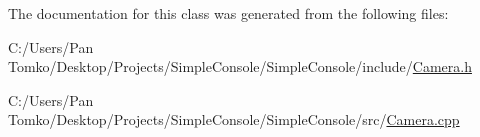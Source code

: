 The documentation for this class was generated from the following files\+:\begin{DoxyCompactItemize}
\item 
C\+:/\+Users/\+Pan Tomko/\+Desktop/\+Projects/\+Simple\+Console/\+Simple\+Console/include/\mbox{\hyperlink{_camera_8h}{Camera.\+h}}\item 
C\+:/\+Users/\+Pan Tomko/\+Desktop/\+Projects/\+Simple\+Console/\+Simple\+Console/src/\mbox{\hyperlink{_camera_8cpp}{Camera.\+cpp}}\end{DoxyCompactItemize}
